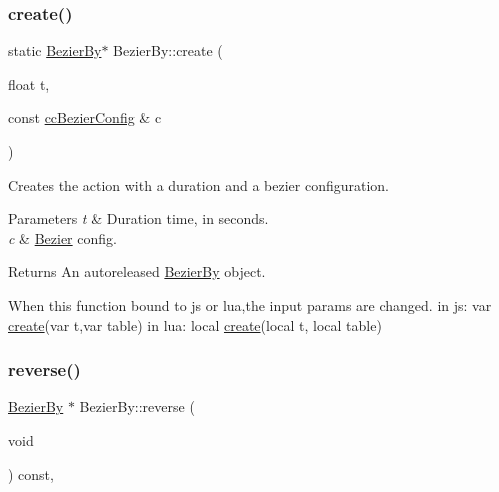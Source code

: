 \subsubsection{\texorpdfstring{create()}{create()}\hspace{0.1cm}{\footnotesize\ttfamily [2/2]}}
{\footnotesize\ttfamily static \hyperlink{classBezierBy}{Bezier\+By}$\ast$ Bezier\+By\+::create (\begin{DoxyParamCaption}\item[{float}]{t,  }\item[{const \hyperlink{struct__ccBezierConfig}{cc\+Bezier\+Config} \&}]{c }\end{DoxyParamCaption})\hspace{0.3cm}{\ttfamily [static]}}

Creates the action with a duration and a bezier configuration. 
\begin{DoxyParams}{Parameters}
{\em t} & Duration time, in seconds. \\
\hline
{\em c} & \hyperlink{structBezier}{Bezier} config. \\
\hline
\end{DoxyParams}
\begin{DoxyReturn}{Returns}
An autoreleased \hyperlink{classBezierBy}{Bezier\+By} object. 
\begin{DoxyCode}
When \textcolor{keyword}{this} \textcolor{keyword}{function} bound to js or lua,the input params are changed.
in js: var \hyperlink{classBezierBy_adc16945f587b0e7850106751d8f5eaef}{create}(var t,var table)
in lua: local \hyperlink{classBezierBy_adc16945f587b0e7850106751d8f5eaef}{create}(local t, local table)
\end{DoxyCode}
 
\end{DoxyReturn}
\mbox{\label{classBezierBy_a6b767fe2cddd49ad43cc2724684e3810}} 
\subsubsection{\texorpdfstring{reverse()}{reverse()}\hspace{0.1cm}{\footnotesize\ttfamily [1/2]}}
{\footnotesize\ttfamily \hyperlink{classBezierBy}{Bezier\+By} $\ast$ Bezier\+By\+::reverse (\begin{DoxyParamCaption}\item[{void}]{ }\end{DoxyParamCaption}) const\hspace{0.3cm}{\ttfamily [override]}, {\ttfamily [virtual]}}

